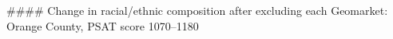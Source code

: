 #### Change in racial/ethnic composition after excluding each Geomarket: Orange County, PSAT score 1070–1180
